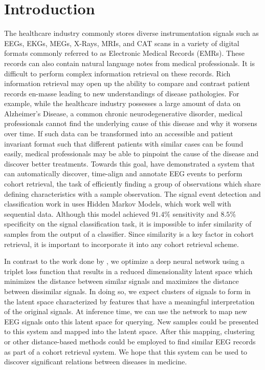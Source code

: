 \chapter{Introduction}

The healthcare industry commonly stores diverse instrumentation signals such as EEGs, EKGs, MEGs, X-Rays, MRIs, and CAT scans in a variety of digital formats commonly referred to as Electronic Medical Records (EMRs).  These records can also contain natural language notes from medical professionals. It is difficult to perform complex information retrieval on these records. Rich information retrieval may open up the ability to compare and contrast patient records en-masse leading to new understandings of disease pathologies. For example, while the healthcare industry possesses a large amount of data on Alzheimer's Disease, a common chronic neurodegenerative disorder, medical professionals cannot find the underlying cause of this disease and why it worsens over time. If such data can be transformed into an accessible and patient invariant format such that different patients with similar cases can be found easily, medical professionals may be able to pinpoint the cause of the disease and discover better treatments. Towards this goal, \citet{piccone} have demonstrated a system that can automatically discover, time-align and annotate EEG events to perform cohort retrieval, the task of efficiently finding a group of observations which share defining characteristics with a sample observation. The signal event detection and classification work in \citet{piccone} uses Hidden Markov Models, which work well with sequential data. Although this model achieved $91.4\%$ sensitivity and $8.5\%$ specificity on the signal classification task, it is impossible to infer similarity of samples from the output of a classifier. Since similarity is a key factor in cohort retrieval, it is important to incorporate it into any cohort retrieval scheme.

In contrast to the work done by \citet{piccone}, we optimize a deep neural network using a triplet loss function that results in a reduced dimensionality latent space which minimizes the distance between similar signals and maximizes the distance between dissimilar signals. In doing so, we expect clusters of signals to form in the latent space characterized by features that have a meaningful interpretation of the original signals. At inference time, we can use the network to map new EEG signals onto this latent space for querying. New samples could be presented to this system and mapped into the latent space. After this mapping, clustering or other distance-based methods could be employed to find similar EEG records as part of a cohort retrieval system. We hope that this system can be used to discover significant relations between diseases in medicine.  

